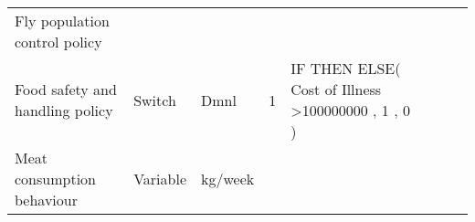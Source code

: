 \begin{landscape}
\begin{longtable}[c]{m{10em}lllm{15em}lll}
Fly population control policy                 &          &                          &                           &                                                                                                                                                                                                                                                                                          &                                                                                                                                                                                              &                                                                                                                                                                                                                                       \\
Food safety and handling policy               & Switch   & Dmnl                     & 1                         & IF THEN ELSE( Cost of Illness \textgreater 100000000 , 1 , 0 )                                                                                                                                                                                                                           &                                                                                                                                                                                              &                                                                                                                                                                                                                                       \\
Meat consumption behaviour                    & Variable & kg/week                  &                           &                                                                                                                                                                                                                                                                                          &                                                                                                                                                                                              &                                                                                                                                                                                                                                       \\

\end{longtable}
\end{landscape}
